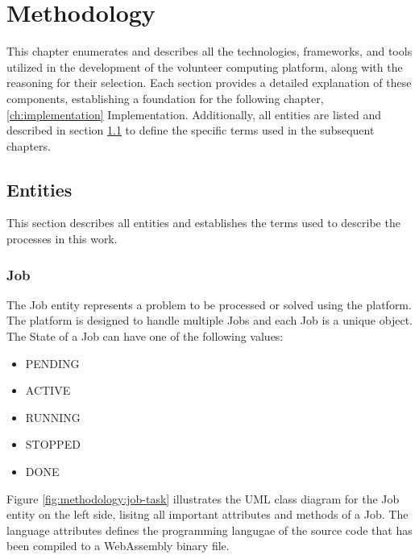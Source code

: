 \chapter{Methodology}
\label{ch:methodology}
This chapter enumerates and describes all the technologies, frameworks, and tools utilized in the development of the volunteer computing platform, along with the reasoning for their selection. Each section provides a detailed explanation of these components, establishing a foundation for the following chapter, \ref{ch:implementation} Implementation. Additionally, all entities are listed and described in section \ref{sec:methodology:entities} to define the specific terms used in the subsequent chapters.

\section{Entities}
\label{sec:methodology:entities}
This section describes all entities and establishes the terms used to describe the processes in this work.

\subsection{Job}
\label{subsec:methodology:entities:job}
The Job entity represents a problem to be processed or solved using the platform. The platform is designed to handle multiple Jobs and each Job is a unique object. The State of a Job can have one of the following values:

\begin{itemize}
\item PENDING
\item ACTIVE
\item RUNNING
\item STOPPED
\item DONE
\end{itemize}

Figure \ref{fig:methodology:job-task} illustrates the \ac{UML} class diagram for the Job entity on the left side, lisitng all important attributes and methods of a Job. The language attributes defines the programming langugae of the source code that has been compiled to a WebAssembly binary file.

